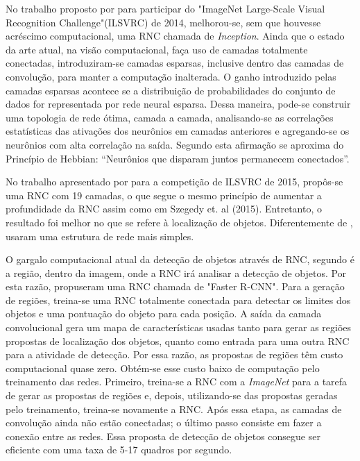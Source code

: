 \documentclass[
	12pt,				%
    oneside,			%
	a4paper,			%
	english,			%
	french,				%
	spanish,			%
	brazil,				%
	]{abntex2}
\begin{document}
No trabalho proposto por  para participar do "ImageNet Large-Scale Visual Recognition Challenge"(ILSVRC) de 2014, melhorou-se, sem que houvesse acréscimo computacional, uma RNC chamada de \textit{Inception}. Ainda que o estado da arte atual, na visão computacional, faça uso de camadas totalmente conectadas, introduziram-se camadas esparsas, inclusive dentro das camadas de convolução, para manter a computação inalterada. O ganho introduzido pelas camadas esparsas acontece se a distribuição de probabilidades do conjunto de dados for representada por rede neural esparsa. Dessa maneira, pode-se construir uma topologia de rede ótima, camada a camada, analisando-se as correlações estatísticas das ativações dos neurônios em camadas anteriores e agregando-se os neurônios com alta correlação na saída. Segundo  esta afirmação se aproxima do Princípio de Hebbian: “Neurônios que disparam juntos permanecem conectados”. 

No trabalho apresentado por  para a competição de ILSVRC de 2015, propôs-se uma RNC com 19 camadas, o que segue o mesmo princípio de aumentar a profundidade da RNC assim como em Szegedy et. al (2015). Entretanto, o resultado foi melhor no que se refere à localização de objetos. Diferentemente de ,  usaram uma estrutura de rede mais simples.

O gargalo computacional atual da detecção de objetos através de RNC, segundo   é a região, dentro da imagem, onde a RNC irá analisar a detecção de objetos. Por esta razão,  propuseram uma RNC chamada de "Faster R-CNN". Para a geração de regiões, treina-se uma RNC totalmente conectada para detectar os limites dos objetos e uma pontuação do objeto para cada posição. A saída da camada convolucional gera um mapa de características usadas tanto para gerar as regiões propostas de localização dos objetos, quanto como entrada para uma outra RNC para a atividade de detecção. Por essa razão, as propostas de regiões têm custo computacional quase  zero. Obtém-se esse custo baixo de computação pelo treinamento das redes. Primeiro, treina-se a RNC com a \textit{ImageNet} para a tarefa de gerar as propostas de regiões e, depois, utilizando-se das propostas geradas pelo treinamento, treina-se novamente a RNC. Após essa etapa, as camadas de convolução ainda não estão conectadas; o último passo consiste em fazer a conexão entre as redes. Essa proposta de detecção de objetos consegue ser eficiente com uma taxa de 5-17 quadros por segundo.
\end{document}
